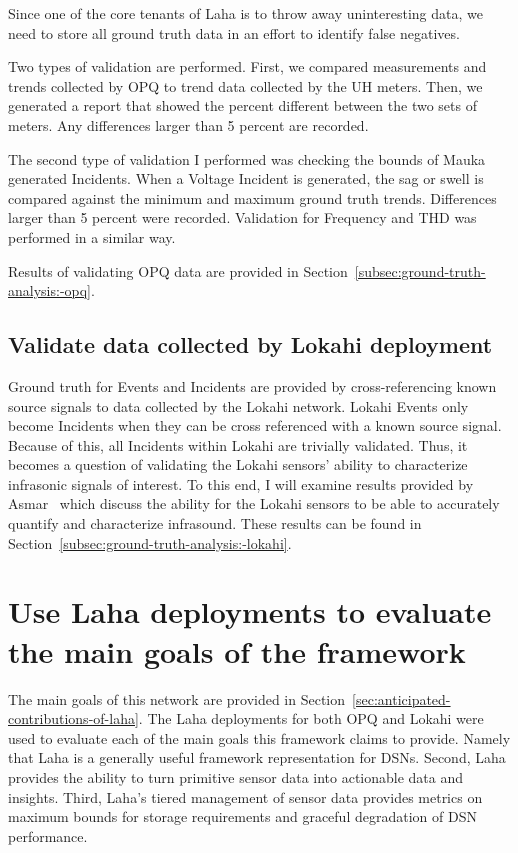 Since one of the core tenants of Laha is to throw away uninteresting data, we need to store all ground truth data in an effort to identify false negatives.

Two types of validation are performed. First, we compared measurements and trends collected by OPQ to trend data collected by the UH meters. Then, we generated a report that showed the percent different between the two sets of meters. Any differences larger than 5 percent are recorded.

The second type of validation I performed was checking the bounds of Mauka generated Incidents. When a Voltage Incident is generated, the sag or swell is compared against the minimum and maximum ground truth trends. Differences larger than 5 percent were recorded. Validation for Frequency and THD was performed in a similar way.

Results of validating OPQ data are provided in Section~\ref{subsec:ground-truth-analysis:-opq}.

\subsection{Validate data collected by Lokahi deployment}\label{subsec:validate-data-collected-by-lokahi-deployment}

Ground truth for Events and Incidents are provided by cross-referencing known source signals to data collected by the Lokahi network. Lokahi Events only become Incidents when they can be cross referenced with a known source signal. Because of this, all Incidents within Lokahi are trivially validated. Thus, it becomes a question of validating the Lokahi sensors' ability to characterize infrasonic signals of interest. To this end, I will examine results provided by Asmar~\cite{asmar19} which discuss the ability for the Lokahi sensors to be able to accurately quantify and characterize infrasound. These results can be found in Section~\ref{subsec:ground-truth-analysis:-lokahi}.

\section{Use Laha deployments to evaluate the main goals of the framework}\label{sec:use-laha-deployments-to-evaluate-the-main-goals-of-the-framework}
The main goals of this network are provided in Section~\ref{sec:anticipated-contributions-of-laha}. The Laha deployments for both OPQ and Lokahi were used to evaluate each of the main goals this framework claims to provide. Namely that Laha is a generally useful framework representation for DSNs. Second, Laha provides the ability to turn primitive sensor data into actionable data and insights. Third, Laha's tiered management of sensor data provides metrics on maximum bounds for storage requirements and graceful degradation of DSN performance.

